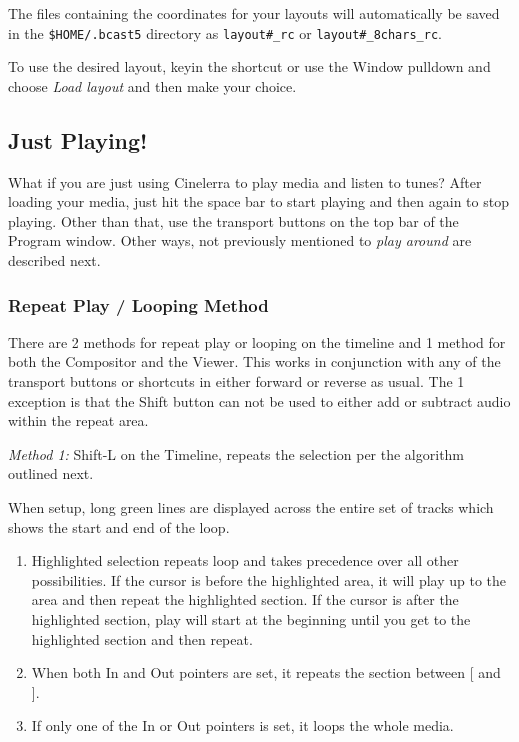 The files containing the coordinates for your layouts will automatically be saved in the \texttt{\$HOME/.bcast5} directory as \texttt{layout\#\_rc} or \texttt{layout\#\_8chars\_rc}.

To use the desired layout, keyin the shortcut or use the Window pulldown and choose \emph{Load layout} and then make your choice. 

\subsection{Just Playing!}%
\label{sub:just_playing_}
What if you are just using Cinelerra to play media and listen to tunes? 
After loading your media, just hit the space bar to start playing and then again to stop playing.  
Other than that, use the transport buttons on the top bar of the Program window.  
Other ways, not previously mentioned to \textit{play around} are described next. 

\subsubsection*{Repeat Play / Looping Method}%
\label{ssub:repeat_play_looping_method}

There are 2 methods for repeat play or looping on the timeline and 1 method for both the Compositor and the Viewer.  This works in conjunction with any of the transport buttons or shortcuts in either forward or reverse as usual.  The 1 exception is that the Shift button can not be used to either add or subtract audio within the repeat area.

\textit{Method 1:} Shift-L on the Timeline, repeats the selection per the algorithm outlined next.
  
When setup, long green lines are displayed across the entire set of tracks which shows the start and end of the loop.
\begin{enumerate}
    \item  Highlighted selection repeats loop and takes precedence over all other possibilities.  
        If the cursor is before the highlighted area, it will play up to the area and then repeat the highlighted section.  
        If the cursor is after the highlighted section, play will start at the beginning until you get to the
        highlighted section and then repeat.
    \item  When both In and Out pointers are set, it repeats the section between [ and ].
    \item  If only one of the In or Out pointers is set, it loops the whole media.
\end{enumerate}

